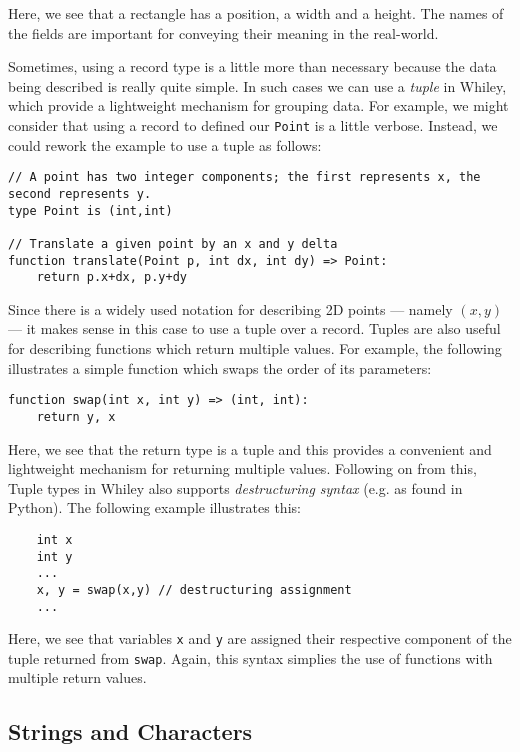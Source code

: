 Here, we see that a rectangle has a position, a width and a height.  The names of the fields are important for conveying their meaning in the real-world.

Sometimes, using a record type is a little more than necessary because the data being described is really quite simple.  In such cases we can use a {\em tuple} in Whiley, which provide a lightweight mechanism for grouping data.  For example, we might consider that using a record to defined our \lstinline{Point} is a little verbose.  Instead, we could rework the example to use a tuple as follows:

\begin{lstlisting}
// A point has two integer components; the first represents x, the second represents y.
type Point is (int,int)

// Translate a given point by an x and y delta
function translate(Point p, int dx, int dy) => Point:
    return p.x+dx, p.y+dy
\end{lstlisting}

Since there is a widely used notation for describing 2D points --- namely $(x,y)$ --- it makes sense in this case to use a tuple over a record.  Tuples are also useful for describing functions which return multiple values.  For example, the following illustrates a simple function which swaps the order of its parameters:

\begin{lstlisting}
function swap(int x, int y) => (int, int):
    return y, x
\end{lstlisting}

Here, we see that the return type is a tuple and this provides a convenient and lightweight mechanism for returning multiple values.  Following on from this, Tuple types in Whiley also supports {\em destructuring syntax} (e.g. as found in Python).  The following example illustrates this:

\begin{lstlisting}
    int x
    int y
    ...
    x, y = swap(x,y) // destructuring assignment
    ...        
\end{lstlisting}

Here, we see that variables \lstinline{x} and \lstinline{y} are assigned their respective component of the tuple returned from \lstinline{swap}.  Again, this syntax simplies the use of functions with multiple return values.

\subsection{Strings and Characters}

